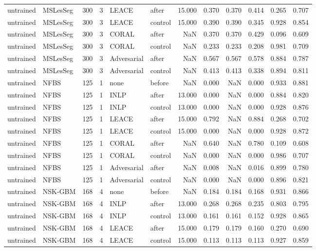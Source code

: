 \begin{tabular}{llrrllrrrrrr}
untrained & MSLesSeg & 300 & 3 & LEACE & after & 15.000 & 0.370 & 0.370 & 0.414 & 0.265 & 0.707 \\
untrained & MSLesSeg & 300 & 3 & LEACE & control & 15.000 & 0.390 & 0.390 & 0.345 & 0.928 & 0.854 \\
untrained & MSLesSeg & 300 & 3 & CORAL & after & NaN & 0.370 & 0.370 & 0.429 & 0.096 & 0.609 \\
untrained & MSLesSeg & 300 & 3 & CORAL & control & NaN & 0.233 & 0.233 & 0.208 & 0.981 & 0.709 \\
untrained & MSLesSeg & 300 & 3 & Adversarial & after & NaN & 0.567 & 0.567 & 0.578 & 0.884 & 0.787 \\
untrained & MSLesSeg & 300 & 3 & Adversarial & control & NaN & 0.413 & 0.413 & 0.338 & 0.894 & 0.811 \\
untrained & NFBS & 125 & 1 & none & before & NaN & 0.000 & NaN & 0.000 & 0.933 & 0.881 \\
untrained & NFBS & 125 & 1 & INLP & after & 13.000 & 0.000 & NaN & 0.000 & 0.884 & 0.820 \\
untrained & NFBS & 125 & 1 & INLP & control & 13.000 & 0.000 & NaN & 0.000 & 0.928 & 0.876 \\
untrained & NFBS & 125 & 1 & LEACE & after & 15.000 & 0.792 & NaN & 0.884 & 0.268 & 0.702 \\
untrained & NFBS & 125 & 1 & LEACE & control & 15.000 & 0.000 & NaN & 0.000 & 0.928 & 0.872 \\
untrained & NFBS & 125 & 1 & CORAL & after & NaN & 0.640 & NaN & 0.780 & 0.109 & 0.608 \\
untrained & NFBS & 125 & 1 & CORAL & control & NaN & 0.000 & NaN & 0.000 & 0.986 & 0.707 \\
untrained & NFBS & 125 & 1 & Adversarial & after & NaN & 0.008 & NaN & 0.016 & 0.899 & 0.780 \\
untrained & NFBS & 125 & 1 & Adversarial & control & NaN & 0.000 & NaN & 0.000 & 0.896 & 0.821 \\
untrained & NSK-GBM & 168 & 4 & none & before & NaN & 0.184 & 0.184 & 0.168 & 0.931 & 0.866 \\
untrained & NSK-GBM & 168 & 4 & INLP & after & 13.000 & 0.268 & 0.268 & 0.235 & 0.803 & 0.795 \\
untrained & NSK-GBM & 168 & 4 & INLP & control & 13.000 & 0.161 & 0.161 & 0.152 & 0.928 & 0.865 \\
untrained & NSK-GBM & 168 & 4 & LEACE & after & 15.000 & 0.179 & 0.179 & 0.160 & 0.270 & 0.690 \\
untrained & NSK-GBM & 168 & 4 & LEACE & control & 15.000 & 0.113 & 0.113 & 0.113 & 0.927 & 0.859 \\

\end{tabular}
